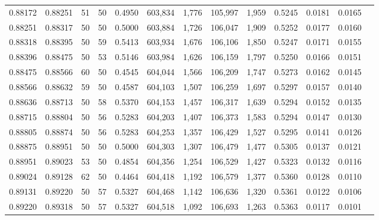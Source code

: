 \begin{tabular}{rrrrrrrrrrrrr}
0.88172 & 0.88251 &    51 &  50 &                                     0.4950 & 603,834 &   1,776 & 105,997 &   1,959 & 0.5245 & 0.0181 & 0.0165 \\
0.88251 & 0.88317 &    50 &  50 &                                     0.5000 & 603,884 &   1,726 & 106,047 &   1,909 & 0.5252 & 0.0177 & 0.0160 \\
0.88318 & 0.88395 &    50 &  59 &                                     0.5413 & 603,934 &   1,676 & 106,106 &   1,850 & 0.5247 & 0.0171 & 0.0155 \\
0.88396 & 0.88475 &    50 &  53 &                                     0.5146 & 603,984 &   1,626 & 106,159 &   1,797 & 0.5250 & 0.0166 & 0.0151 \\
0.88475 & 0.88566 &    60 &  50 &                                     0.4545 & 604,044 &   1,566 & 106,209 &   1,747 & 0.5273 & 0.0162 & 0.0145 \\
0.88566 & 0.88632 &    59 &  50 &                                     0.4587 & 604,103 &   1,507 & 106,259 &   1,697 & 0.5297 & 0.0157 & 0.0140 \\
0.88636 & 0.88713 &    50 &  58 &                                     0.5370 & 604,153 &   1,457 & 106,317 &   1,639 & 0.5294 & 0.0152 & 0.0135 \\
0.88715 & 0.88804 &    50 &  56 &                                     0.5283 & 604,203 &   1,407 & 106,373 &   1,583 & 0.5294 & 0.0147 & 0.0130 \\
0.88805 & 0.88874 &    50 &  56 &                                     0.5283 & 604,253 &   1,357 & 106,429 &   1,527 & 0.5295 & 0.0141 & 0.0126 \\
0.88875 & 0.88951 &    50 &  50 &                                     0.5000 & 604,303 &   1,307 & 106,479 &   1,477 & 0.5305 & 0.0137 & 0.0121 \\
0.88951 & 0.89023 &    53 &  50 &                                     0.4854 & 604,356 &   1,254 & 106,529 &   1,427 & 0.5323 & 0.0132 & 0.0116 \\
0.89024 & 0.89128 &    62 &  50 &                                     0.4464 & 604,418 &   1,192 & 106,579 &   1,377 & 0.5360 & 0.0128 & 0.0110 \\
0.89131 & 0.89220 &    50 &  57 &                                     0.5327 & 604,468 &   1,142 & 106,636 &   1,320 & 0.5361 & 0.0122 & 0.0106 \\
0.89220 & 0.89318 &    50 &  57 &                                     0.5327 & 604,518 &   1,092 & 106,693 &   1,263 & 0.5363 & 0.0117 & 0.0101 \\

\end{tabular}
